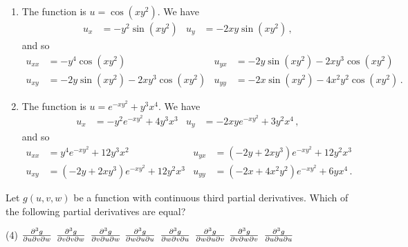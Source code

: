 \begin{solution}
\begin{enumerate}
\item
The function is $u = \cos(xy^2)$.
We have
\begin{align*}
u_x &= -y^2 \sin(xy^2) &
u_y &= -2xy \sin(xy^2)\,,
\end{align*}
and so
\begin{align*}
u_{xx} &= -y^4 \cos(xy^2) &
u_{yx} &= -2y \sin(xy^2) - 2xy^3 \cos(xy^2) \\
u_{xy} &= -2y \sin(xy^2) - 2xy^3 \cos(xy^2) &
u_{yy} &= -2x \sin(xy^2) - 4x^2y^2 \cos(xy^2)\,.
\end{align*}
\item
The function is $u = e^{-xy^2} + y^3x^4$. We have
\begin{align*}
u_{x} &= -y^2 e^{-xy^2} + 4y^3x^3 &
u_{y} &= -2xy e^{-xy^2} + 3y^2x^4\,,
\end{align*}
and so
\begin{align*}
u_{xx} &= y^4 e^{-xy^2} + 12 y^3x^2 &
u_{yx} &= (-2y + 2xy^3) e^{-xy^2} + 12y^2x^3 \\
u_{xy} &= (-2y + 2xy^3) e^{-xy^2} + 12y^2x^3 &
u_{yy} &= (-2x + 4x^2y^2)e^{-xy^2} + 6yx^4\,.
\end{align*}
\end{enumerate}
\end{solution}

\begin{question}
Let $g(u, v, w)$ be a function with continuous third partial derivatives. Which of the following partial derivatives are equal?
\begin{tasks}(4)
\task
$\frac{\partial^3 g}{\partial u \partial v \partial w}$
\task
$\frac{\partial^3 g}{\partial v \partial v \partial w}$
\task
$\frac{\partial^3 g}{\partial v \partial u \partial w}$
\task
$\frac{\partial^3 g}{\partial w \partial u \partial u}$
\task
$\frac{\partial^3 g}{\partial w \partial v \partial u}$
\task
$\frac{\partial^3 g}{\partial w \partial u \partial v}$
\task
$\frac{\partial^3 g}{\partial v \partial w \partial v}$
\task
$\frac{\partial^3 g}{\partial u \partial u \partial u}$
\end{tasks}
\end{question}


